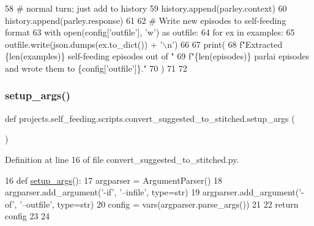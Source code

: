 \begin{DoxyCode}
58                 \textcolor{comment}{# normal turn; just add to history}
59                 history.append(parley.context)
60                 history.append(parley.response)
61 
62     \textcolor{comment}{# Write new episodes to self-feeding format}
63     with open(config[\textcolor{stringliteral}{'outfile'}], \textcolor{stringliteral}{'w'}) \textcolor{keyword}{as} outfile:
64         \textcolor{keywordflow}{for} ex \textcolor{keywordflow}{in} examples:
65             outfile.write(json.dumps(ex.to\_dict()) + \textcolor{stringliteral}{'\(\backslash\)n'})
66 
67     print(
68         f\textcolor{stringliteral}{"Extracted \{len(examples)\} self-feeding episodes out of "}
69         f\textcolor{stringliteral}{"\{len(episodes)\} parlai episodes and wrote them to \{config['outfile']\}."}
70     )
71 
72 
\end{DoxyCode}
\mbox{\label{namespaceprojects_1_1self__feeding_1_1scripts_1_1convert__suggested__to__stitched_abb3be1e61354f80ddbc5d87ffe42e518}} 
\subsubsection{\texorpdfstring{setup\+\_\+args()}{setup\_args()}}
{\footnotesize\ttfamily def projects.\+self\+\_\+feeding.\+scripts.\+convert\+\_\+suggested\+\_\+to\+\_\+stitched.\+setup\+\_\+args (\begin{DoxyParamCaption}{ }\end{DoxyParamCaption})}



Definition at line 16 of file convert\+\_\+suggested\+\_\+to\+\_\+stitched.\+py.


\begin{DoxyCode}
16 \textcolor{keyword}{def }\hyperlink{namespaceprojects_1_1self__feeding_1_1scripts_1_1convert__suggested__to__stitched_abb3be1e61354f80ddbc5d87ffe42e518}{setup\_args}():
17     argparser = ArgumentParser()
18     argparser.add\_argument(\textcolor{stringliteral}{'-if'}, \textcolor{stringliteral}{'--infile'}, type=str)
19     argparser.add\_argument(\textcolor{stringliteral}{'-of'}, \textcolor{stringliteral}{'--outfile'}, type=str)
20     config = vars(argparser.parse\_args())
21 
22     \textcolor{keywordflow}{return} config
23 
24 
\end{DoxyCode}


